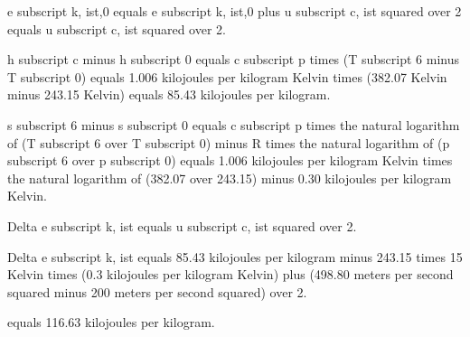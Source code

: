 e subscript k, ist,0 equals e subscript k, ist,0 plus u subscript c, ist squared over 2 equals u subscript c, ist squared over 2.

h subscript c minus h subscript 0 equals c subscript p times (T subscript 6 minus T subscript 0) equals 1.006 kilojoules per kilogram Kelvin times (382.07 Kelvin minus 243.15 Kelvin) equals 85.43 kilojoules per kilogram.

s subscript 6 minus s subscript 0 equals c subscript p times the natural logarithm of (T subscript 6 over T subscript 0) minus R times the natural logarithm of (p subscript 6 over p subscript 0) equals 1.006 kilojoules per kilogram Kelvin times the natural logarithm of (382.07 over 243.15) minus 0.30 kilojoules per kilogram Kelvin.

Delta e subscript k, ist equals u subscript c, ist squared over 2.

Delta e subscript k, ist equals 85.43 kilojoules per kilogram minus 243.15 times 15 Kelvin times (0.3 kilojoules per kilogram Kelvin) plus (498.80 meters per second squared minus 200 meters per second squared) over 2.

equals 116.63 kilojoules per kilogram.